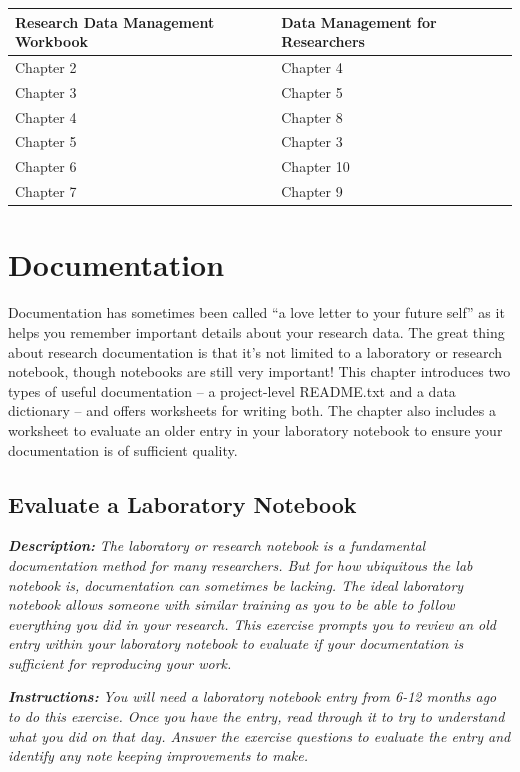 \documentclass[
]{book}
\begin{document}
\begin{tabular}{l|l}
\hline
Research Data Management Workbook & Data Management for Researchers\\
\hline
Chapter 2 & Chapter 4\\
\hline
Chapter 3 & Chapter 5\\
\hline
Chapter 4 & Chapter 8\\
\hline
Chapter 5 & Chapter 3\\
\hline
Chapter 6 & Chapter 10\\
\hline
Chapter 7 & Chapter 9\\
\hline
\end{tabular}

\hypertarget{documentation}{%
\chapter{Documentation}\label{documentation}}

Documentation has sometimes been called ``a love letter to your future self'' as it helps you remember important details about your research data. The great thing about research documentation is that it's not limited to a laboratory or research notebook, though notebooks are still very important! This chapter introduces two types of useful documentation -- a project-level README.txt and a data dictionary -- and offers worksheets for writing both. The chapter also includes a worksheet to evaluate an older entry in your laboratory notebook to ensure your documentation is of sufficient quality.

\hypertarget{lab-notebook}{%
\section{Evaluate a Laboratory Notebook}\label{lab-notebook}}

\textbf{\emph{Description:}} \emph{The laboratory or research notebook is a fundamental documentation method for many researchers. But for how ubiquitous the lab notebook is, documentation can sometimes be lacking. The ideal laboratory notebook allows someone with similar training as you to be able to follow everything you did in your research. This exercise prompts you to review an old entry within your laboratory notebook to evaluate if your documentation is sufficient for reproducing your work.}

\textbf{\emph{Instructions:}} \emph{You will need a laboratory notebook entry from 6-12 months ago to do this exercise. Once you have the entry, read through it to try to understand what you did on that day. Answer the exercise questions to evaluate the entry and identify any note keeping improvements to make.}
\end{document}
